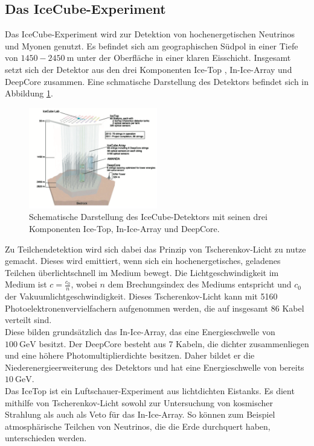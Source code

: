 \subsection{Das IceCube-Experiment}
Das IceCube-Experiment wird zur Detektion von hochenergetischen Neutrinos und Myonen genutzt. Es befindet sich am geographischen Südpol in einer Tiefe von $1450-\SI{2450}{\meter}$ unter der Oberfläche in einer klaren Eisschicht. Insgesamt setzt sich der Detektor aus den drei Komponenten Ice-Top \cite{3246225}, In-Ice-Array \cite{ACHTERBERG2006155} und DeepCore \cite{2143409} zusammen. Eine schmatische Darstellung des Detektors befindet sich in Abbildung \ref{fig:Ice}.
\begin{figure}
  \centering
  \includegraphics[width=0.5\textwidth]{graphics/IceCube.png}
  \caption{Schematische Darstellung des IceCube-Detektors mit seinen drei Komponenten Ice-Top, In-Ice-Array und DeepCore.\cite{IceCube}}
  \label{fig:Ice}
\end{figure}
Zu Teilchendetektion wird sich dabei das Prinzip von Tscherenkov-Licht zu nutze gemacht. Dieses wird emittiert, wenn sich ein hochenergetisches, geladenes Teilchen überlichtschnell im Medium bewegt. Die Lichtgeschwindigkeit im Medium ist $c=\frac{c_{0}}{n}$, wobei $n$ dem Brechungsindex des Mediums entspricht und $c_{0}$ der Vakuumlichtgeschwindigkeit. Dieses Tscherenkov-Licht kann mit 5160 Photoelektronenvervielfachern aufgenommen werden, die auf insgesamt 86 Kabel verteilt sind.\\
Diese bilden grundsätzlich das In-Ice-Array, das eine Energieschwelle von $\SI{100}{\giga\electronvolt}$ besitzt. Der DeepCore besteht aus 7 Kabeln, die dichter zusammenliegen und eine höhere Photomultiplierdichte besitzen. Daher bildet er die Niederenergieerweiterung des Detektors und hat eine Energieschwelle von bereits $\SI{10}{\giga\electronvolt}$.\\
Das IceTop ist ein Luftschauer-Experiment aus lichtdichten Eistanks. Es dient mithilfe von Tscherenkov-Licht sowohl zur Untersuchung von kosmischer Strahlung als auch als Veto für das In-Ice-Array. So können zum Beispiel atmosphärische Teilchen von Neutrinos, die die Erde durchquert haben, unterschieden werden.\\

